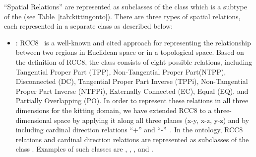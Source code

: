 ``Spatial Relations'' are represented as subclasses of the  
class which is a subtype of the  (see Table~\ref{tab:kittingonto}). 
There are three types of spatial relations, each represented in a separate class as described below:
\begin{itemize}
 \item {}: RCC8~\cite{Wolter.KR.2000} is a well-known and cited 
approach for representing the relationship between two regions in Euclidean space or 
in a topological space. Based on the definition of RCC8, the class  
consists of eight possible relations, including Tangential Proper Part (TPP), Non-Tangential 
Proper Part(NTPP), Disconnected (DC), Tangential Proper Part Inverse (TPPi), Non-Tangential 
Proper Part Inverse (NTPPi), Externally Connected (EC), Equal (EQ), and Partially 
Overlapping (PO). In order to represent these relations in all three dimensions for the 
kitting domain, we have extended RCC8 to a three-dimensional space by applying it along 
all three planes (x-y, x-z, y-z) and by including cardinal direction relations ``+'' 
and ``-''~\cite{SCHLENOFF.ECDRM.2012}. In the ontology, RCC8 relations and cardinal direction 
relations are represented as subclasses of the class . Examples of 
such classes are , , , and .


\end{itemize}
